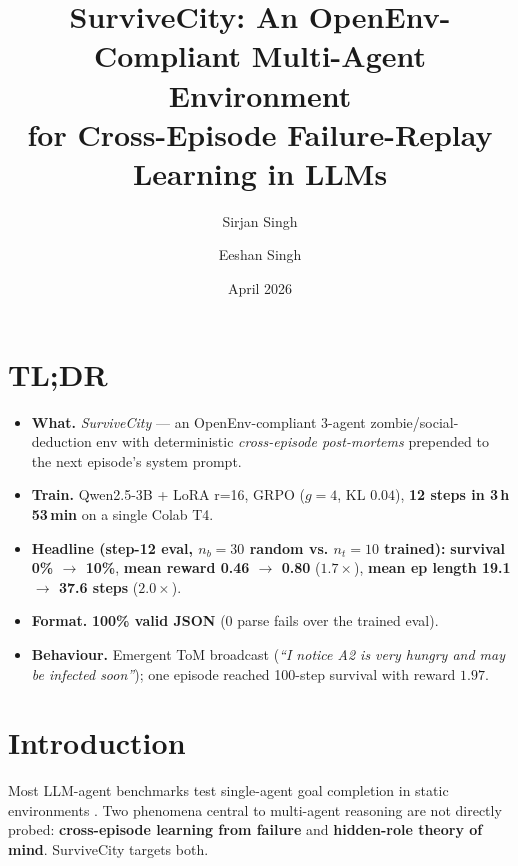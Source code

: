 \documentclass[11pt,a4paper]{article}
\title{SurviveCity: An OpenEnv-Compliant Multi-Agent Environment\\
       for Cross-Episode Failure-Replay Learning in LLMs}
\author[1]{Sirjan Singh}
\author[1]{Eeshan Singh}
\affil[1]{Team PyGuys --- Meta $\times$ PyTorch $\times$ Scaler OpenEnv Hackathon, India 2026}
\date{April 2026}
\begin{document}
\maketitle

\section*{TL;DR}
\begin{itemize}[leftmargin=*,nosep]
  \item \textbf{What.} \emph{SurviveCity} --- an OpenEnv-compliant 3-agent zombie/social-deduction
        env with deterministic \emph{cross-episode post-mortems} prepended to the next episode's
        system prompt.
  \item \textbf{Train.} Qwen2.5-3B + LoRA r=16, GRPO ($g{=}4$, KL $0.04$),
        \textbf{12 steps in 3\,h\,53\,min} on a single Colab T4.
  \item \textbf{Headline (step-12 eval, $n_b{=}30$ random vs. $n_t{=}10$ trained):}
        \textbf{survival 0\% $\rightarrow$ 10\%}, \textbf{mean reward 0.46 $\rightarrow$ 0.80}
        ($1.7\!\times$), \textbf{mean ep length 19.1 $\rightarrow$ 37.6 steps} ($2.0\!\times$).
  \item \textbf{Format.} \textbf{100\% valid JSON} (0 parse fails over the trained eval).
  \item \textbf{Behaviour.} Emergent ToM broadcast (\textit{``I notice A2 is very hungry
        and may be infected soon''}); one episode reached 100-step survival with
        reward $1.97$.
\end{itemize}

\section{Introduction}
\label{sec:intro}

Most LLM-agent benchmarks test single-agent goal completion in static environments
\cite{agentbench2023}. Two phenomena central to multi-agent reasoning are not directly
probed: \textbf{cross-episode learning from failure} and \textbf{hidden-role theory of mind}.
SurviveCity targets both.
\end{document}
